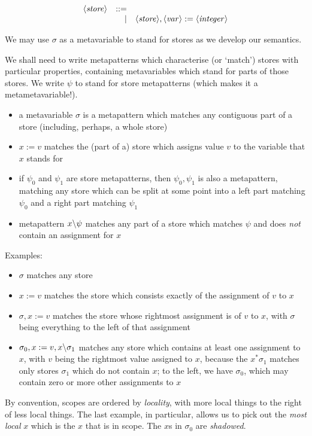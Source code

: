 \documentclass{article}
\begin{document}
\[\begin{array}{rrl}
    \langle \mathit{store} \rangle & ::= & \\
               &   | & \langle \mathit{store} \rangle, \langle \mathit{var} \rangle := \langle \mathit{integer} \rangle
\end{array}\]

We may use $\sigma$ as a metavariable to stand for stores as we develop our semantics.

We shall need to write metapatterns which characterise (or `match') stores with particular properties, containing metavariables which stand for parts of those stores. We write $\psi$ to stand for store metapatterns (which makes it a metametavariable!).
\begin{itemize}
\item a metavariable $\sigma$ is a metapattern which matches any contiguous part of a store (including, perhaps, a whole store)
\item $x := v$ matches the (part of a) store which assigns value $v$ to the variable that $x$ stands for
\item if $\psi_0$ and $\psi_1$ are store metapatterns, then $\psi_0,\psi_1$ is also a metapattern, matching any store which can be split at some point into a left part matching $\psi_0$ and a right part matching $\psi_1$
\item metapattern $x \backslash \psi$ matches any part of a store which matches $\psi$ and does \emph{not} contain an assignment for $x$
\end{itemize}

Examples:
\begin{itemize}
\item $\sigma$ matches any store
\item $x := v$ matches the store which consists exactly of the assignment of $v$ to $x$
\item $\sigma, x := v$ matches the store whose rightmost assignment is of $v$ to $x$, with $\sigma$ being everything to the left of that assignment
\item $\sigma_0, x := v, x \backslash \sigma_1$ matches any store which contains at least one assignment to $x$, with $v$ being the rightmost value assigned to $x$, because the $x^\ast\sigma_1$ matches only stores $\sigma_1$ which do not contain $x$; to the left, we have $\sigma_0$, which may contain zero or more other assignments to $x$
\end{itemize}
By convention, scopes are ordered by \emph{locality}, with more local things to the right of less local things.
The last example, in particular, allows us to pick out the \emph{most local} $x$ which is the $x$ that is in scope. The $x$s in $\sigma_0$ are \emph{shadowed}.
\end{document}

